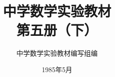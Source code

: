 \documentclass[b5paper, openany]{ctexbook}
\theoremstyle{plain}
\begin{document}
\title{\Huge\bfseries 中学数学实验教材\\第五册（下）}



\author{\Large 中学数学实验教材编写组编}
\date{\Large 1985年5月}

\maketitle




\frontmatter


\tableofcontents


\mainmatter

%  
%
%   
%  
%  

\setcounter{chapter}{4}
 

  
  
  
\end{document}
